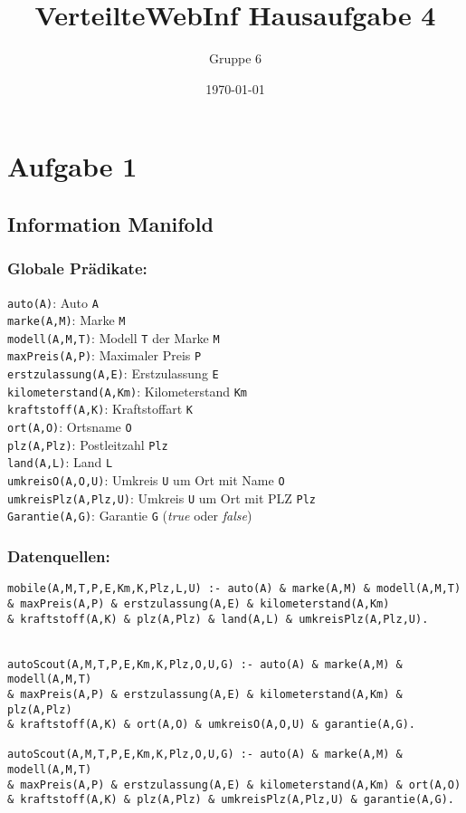 \documentclass[a4paper]{article}
\author{Gruppe 6}
\title{\textbf{VerteilteWebInf Hausaufgabe 4}}
\date{\today}
\begin{document}
\maketitle


\section*{Aufgabe 1}


\subsection*{Information Manifold}
\subsubsection*{Globale Prädikate:}
\texttt{auto(A)}: Auto \texttt{A}\\
\texttt{marke(A,M)}: Marke \texttt{M} \\
\texttt{modell(A,M,T)}: Modell \texttt{T} der Marke \texttt{M}\\
\texttt{maxPreis(A,P)}: Maximaler Preis \texttt{P} \\
\texttt{erstzulassung(A,E)}: Erstzulassung \texttt{E} \\
\texttt{kilometerstand(A,Km)}: Kilometerstand \texttt{Km}\\
\texttt{kraftstoff(A,K)}: Kraftstoffart \texttt{K}\\
\texttt{ort(A,O)}: Ortsname \texttt{O}\\
\texttt{plz(A,Plz)}: Postleitzahl \texttt{Plz}\\
\texttt{land(A,L)}: Land \texttt{L}\\
\texttt{umkreisO(A,O,U)}: Umkreis \texttt{U} um Ort mit Name \texttt{O}\\
\texttt{umkreisPlz(A,Plz,U)}: Umkreis \texttt{U} um Ort mit PLZ \texttt{Plz} \\
\texttt{Garantie(A,G)}: Garantie \texttt{G} (\emph{true} oder \emph{false})\\

\subsubsection*{Datenquellen:}
\begin{verbatim}
mobile(A,M,T,P,E,Km,K,Plz,L,U) :- auto(A) & marke(A,M) & modell(A,M,T) 
& maxPreis(A,P) & erstzulassung(A,E) & kilometerstand(A,Km) 
& kraftstoff(A,K) & plz(A,Plz) & land(A,L) & umkreisPlz(A,Plz,U).


autoScout(A,M,T,P,E,Km,K,Plz,O,U,G) :- auto(A) & marke(A,M) & modell(A,M,T) 
& maxPreis(A,P) & erstzulassung(A,E) & kilometerstand(A,Km) & plz(A,Plz)
& kraftstoff(A,K) & ort(A,O) & umkreisO(A,O,U) & garantie(A,G).

autoScout(A,M,T,P,E,Km,K,Plz,O,U,G) :- auto(A) & marke(A,M) & modell(A,M,T) 
& maxPreis(A,P) & erstzulassung(A,E) & kilometerstand(A,Km) & ort(A,O)
& kraftstoff(A,K) & plz(A,Plz) & umkreisPlz(A,Plz,U) & garantie(A,G).
\end{verbatim}
\end{document}
